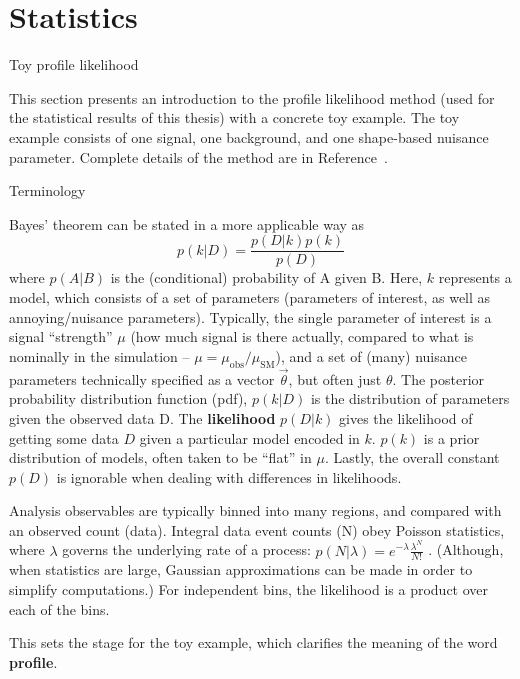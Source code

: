 \chapter{Statistics}
\label{appendix:statistics}

\begin{section}{Toy profile likelihood}


This section presents an introduction to the profile likelihood method
(used for the statistical results of this thesis) with a concrete toy example.
The toy example consists of one signal, one background, and one shape-based
nuisance parameter. Complete details of the method are in Reference~\cite{STAT:Cowan2010js}.


\begin{subsection}{Terminology}

Bayes' theorem can be stated in a more applicable way as
\begin{equation}
p(k|D) = \frac{p(D|k)p(k)}{p(D)}
\end{equation}
where $p(A|B)$ is the (conditional) probability of A given B.
Here, $k$ represents a model, which consists of a set of parameters 
(parameters of interest, as well as annoying/nuisance parameters). 
Typically, the single parameter of interest is a signal ``strength'' $\mu$
    (how much signal is there actually, compared to what is nominally in the simulation -- $\mu = \mu_\mathrm{obs}/\mu_\mathrm{SM}$), 
 and a set of (many) nuisance parameters technically specified
as a vector $\vec{\theta}$, but often just $\theta$. The posterior probability 
distribution function (pdf), $p(k|D)$ is the distribution of parameters given the observed
data D. The \textbf{likelihood} $p(D|k)$ gives the likelihood of getting some data $D$
given a particular model encoded in $k$. $p(k)$ is a prior distribution of models, often
taken to be ``flat'' in $\mu$. Lastly, the overall constant $p(D)$ is ignorable when dealing
with differences in likelihoods.

Analysis observables are typically binned into many regions, and compared with an observed count (data).
Integral data event counts (N) obey Poisson statistics, where $\lambda$ governs the underlying
rate of a process: $p(N|\lambda) = e^{-\lambda}\frac{\lambda^N}{N!}$ .
(Although, when statistics are large, Gaussian approximations can be made in order to simplify computations.)
For independent bins, the likelihood is a product over each of the bins.

This sets the stage for the toy example, which clarifies the meaning of the word \textbf{profile}.




\end{subsection}
\end{section}

